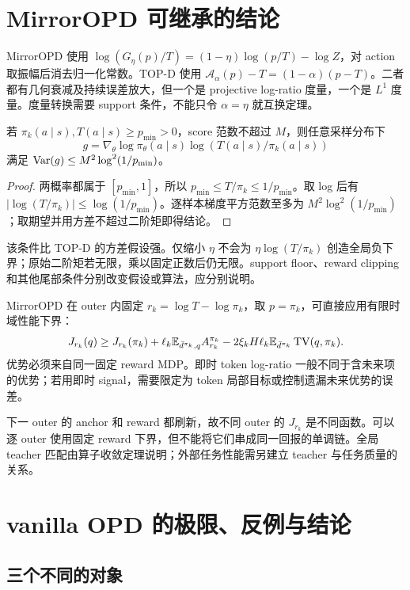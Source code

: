 \section{MirrorOPD 可继承的结论}

MirrorOPD 使用 $\log(G_\eta(p)/T)=(1-\eta)\log(p/T)-\log Z$，对 action 取振幅后消去归一化常数。TOP-D 使用 $\mathcal A_\alpha(p)-T=(1-\alpha)(p-T)$。二者都有几何衰减及持续误差放大，但一个是 projective log-ratio 度量，一个是 $L^1$ 度量。度量转换需要 support 条件，不能只令 $\alpha=\eta$ 就互换定理。

\begin{proposition}
\label{prop:mirror-conditional-variance}
若 $\pi_k(a\mid s),T(a\mid s)\geq p_{\min}>0$，score 范数不超过 $M$，则任意采样分布下
\[
 g=\nabla_\theta\log\pi_\theta(a\mid s)\log(T(a\mid s)/\pi_k(a\mid s))
\]
满足 $\operatorname{Var}(g)\leq M^2\log^2(1/p_{\min})$。
\end{proposition}
\begin{proof}
两概率都属于 $[p_{\min},1]$，所以 $p_{\min}\leq T/\pi_k\leq1/p_{\min}$。取 log 后有 $|\log(T/\pi_k)|\leq\log(1/p_{\min})$。逐样本梯度平方范数至多为 $M^2\log^2(1/p_{\min})$；取期望并用方差不超过二阶矩即得结论。
\end{proof}

该条件比 TOP-D 的方差假设强。仅缩小 $\eta$ 不会为 $\eta\log(T/\pi_k)$ 创造全局负下界；原始二阶矩若无限，乘以固定正数后仍无限。support floor、reward clipping 和其他尾部条件分别改变假设或算法，应分别说明。

MirrorOPD 在 outer 内固定 $r_k=\log T-\log\pi_k$，取 $p=\pi_k$，可直接应用有限时域性能下界：
\[
 J_{r_k}(q)\geq J_{r_k}(\pi_k)+\ell_k\mathbb{E}_{\bar d^{\pi_k},q}A_{r_k}^{\pi_k}
 -2\xi_kH\ell_k\mathbb{E}_{\bar d^{\pi_k}}\operatorname{TV}(q,\pi_k).
\]
优势必须来自同一固定 reward MDP。即时 token log-ratio 一般不同于含未来项的优势；若用即时 signal，需要限定为 token 局部目标或控制遗漏未来优势的误差。

下一 outer 的 anchor 和 reward 都刷新，故不同 outer 的 $J_{r_k}$ 是不同函数。可以逐 outer 使用固定 reward 下界，但不能将它们串成同一回报的单调链。全局 teacher 匹配由算子收敛定理说明；外部任务性能需另建立 teacher 与任务质量的关系。

\section{vanilla OPD 的极限、反例与结论}
\subsection{三个不同的对象}

